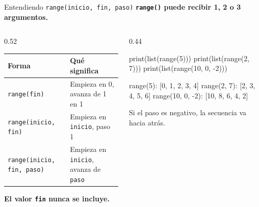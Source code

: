 \documentclass[aspectratio=169, 11pt]{beamer}
\begin{document}
\begin{frame}[fragile,shrink=30]{Entendiendo \texttt{range(inicio, fin, paso)}}
  \vspace{-6pt}
  {\small\color{arcaDark}\bfseries
    \texttt{range()} puede recibir 1, 2 o 3 argumentos.}

  \vspace{5pt}
  \begin{columns}[T]
    \begin{column}{0.52\textwidth}
      {\footnotesize
      \renewcommand{\arraystretch}{1.35}
      \begin{tabular}{@{}l l@{}}
        \toprule
        {\bfseries\color{arcaDark} Forma}
        & {\bfseries\color{arcaDark} Qué significa} \\
        \midrule
        \texttt{range(fin)} &
        Empieza en 0, avanza de 1 en 1 \\
        \texttt{range(inicio, fin)} &
        Empieza en \texttt{inicio}, paso 1 \\
        \texttt{range(inicio, fin, paso)} &
        Empieza en \texttt{inicio}, avanza de \texttt{paso} \\
        \bottomrule
      \end{tabular}
      }

      \vspace{7pt}
      {\scriptsize\color{arcaRed}\bfseries
        \faExclamationTriangle\hspace{4pt}
        El valor \texttt{fin} nunca se incluye.}
    \end{column}

    \begin{column}{0.44\textwidth}
      \begin{pyblock}
print(list(range(5)))
print(list(range(2, 7)))
print(list(range(10, 0, -2)))
      \end{pyblock}
      \vspace{-2pt}
      \begin{outputblock}
range(5): [0, 1, 2, 3, 4]
range(2, 7): [2, 3, 4, 5, 6]
range(10, 0, -2): [10, 8, 6, 4, 2]
      \end{outputblock}

      \vspace{5pt}
      {\scriptsize\color{textMuted}
        Si el paso es negativo, la secuencia
        va hacia atrás.}
    \end{column}
  \end{columns}
\end{frame}
\end{document}
